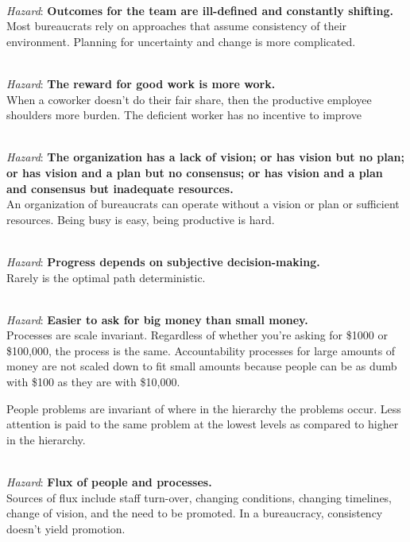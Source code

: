 \ \\
\textit{Hazard}: \textbf{Outcomes for the team are ill-defined and constantly shifting.}\\
Most bureaucrats rely on approaches that assume consistency of their environment. Planning for uncertainty and change is more complicated.

\ \\
\textit{Hazard}: \textbf{The reward for good work is more work.}\\
When a coworker doesn't do their fair share, then the productive employee shoulders more burden. The deficient worker has no incentive to improve

\ \\
\textit{Hazard}: \textbf{The organization has a lack of vision; or has vision but no plan; or has vision and a plan but no consensus; or has vision and a plan and consensus but inadequate resources.}\\
An organization of bureaucrats can operate without a vision or plan or sufficient resources. Being busy is easy, being productive is hard.

\ \\
\textit{Hazard}: \textbf{Progress depends on subjective decision-making.}\\
Rarely is the optimal path deterministic. 

\ \\
\textit{Hazard}: \textbf{Easier to ask for big money than small money.}\\
Processes are scale invariant. Regardless of whether you're asking for \$1000 or \$100,000, the process is the same. Accountability processes for large amounts of money are not scaled down to fit small amounts because people can be as dumb with \$100 as they are with \$10,000.


People problems are invariant of where in the hierarchy the problems occur. Less attention is paid to the same problem at the lowest levels as compared to higher in the hierarchy.


\ \\
\textit{Hazard}: \textbf{Flux of people and processes.} \\
Sources of flux include staff turn-over, changing conditions, changing timelines, change of vision, and the need to be promoted. In a bureaucracy, consistency doesn't yield promotion.

